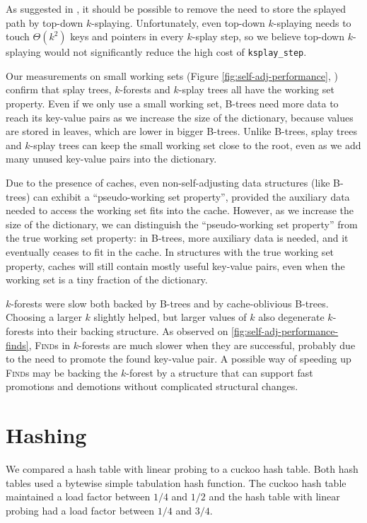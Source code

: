 As suggested in \cite{ksplay-sherk}, it should be possible to remove the
need to store the splayed path by top-down \mbox{$k$-splaying}.
Unfortunately, even top-down \mbox{$k$-splaying} needs to touch
$\Theta(k^2)$ keys and pointers in every $k$-splay step, so we believe top-down
\mbox{$k$-splaying} would not significantly reduce the high cost of
\texttt{ksplay\_step}.

Our measurements on small working sets (Figure
\ref{fig:self-adj-performance},
) confirm that splay trees, $k$-forests
and $k$-splay trees all have the working set property.
Even if we only use a small working set, B-trees need more data to reach
its key-value pairs as we increase the size of the dictionary, because values
are stored in leaves, which are lower in bigger B-trees.
Unlike B-trees, splay trees and $k$-splay trees can keep the small working set
close to the root, even as we add many unused key-value pairs into the
dictionary.

Due to the presence of caches, even non-self-adjusting data structures (like
\mbox{B-trees}) can exhibit a ``pseudo-working set property'', provided
the auxiliary data needed to access the working set fits into the cache.
However, as we increase the size of the dictionary, we can distinguish
the ``pseudo-working set property'' from the true working set property:
in B-trees, more auxiliary data is needed, and it eventually ceases to fit
in the cache.
In structures with the true working set property, caches will still contain
mostly useful key-value pairs, even when the working set is a tiny fraction
of the dictionary.

$k$-forests were slow both backed by B-trees and by cache-oblivious B-trees.
Choosing a larger $k$ slightly helped, but larger values of $k$ also degenerate
\mbox{$k$-forests} into their backing structure.
As observed on \ref{fig:self-adj-performance-finds}, \textsc{Find}s in
$k$-forests are much slower when they are successful, probably due to the need
to promote the found key-value pair. A possible way of speeding up
\textsc{Find}s may be backing the \mbox{$k$-forest} by a structure that can
support fast promotions and demotions without complicated structural changes.

\section{Hashing}
\label{sec:hashing-results}
We compared a hash table with linear probing to a cuckoo hash table.
Both hash tables used a bytewise simple tabulation hash function.
The cuckoo hash table maintained a load factor between $1/4$ and
$1/2$ and the hash table with linear probing had a load factor
between $1/4$ and $3/4$.

